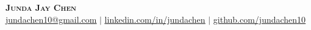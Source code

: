 
\begin{center}
    \textbf{\Huge \scshape Junda Jay Chen} \\ \vspace{1pt}
    \small \href{mailto:x@x.com}{\underline{jundachen10@gmail.com}} $|$ 
    \href{https://linkedin.com/in/jundachen}{\underline{linkedin.com/in/jundachen}} $|$
    \href{https://github.com/jundachen10}{\underline{github.com/jundachen10}}
\end{center}